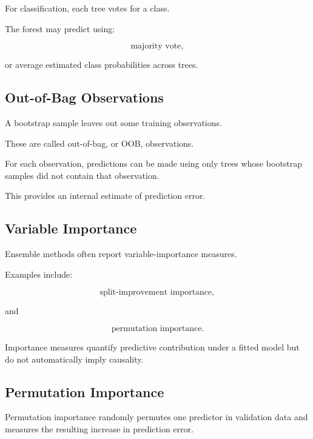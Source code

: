 For classification, each tree votes for a class.

The forest may predict using:

\[
\boxed{
\text{majority vote},
}
\]

or average estimated class probabilities across trees.

\subsection{Out-of-Bag Observations}
\label{subsec:out-of-bag}

A bootstrap sample leaves out some training observations.

These are called out-of-bag, or OOB, observations.

For each observation, predictions can be made using only trees whose
bootstrap samples did not contain that observation.

This provides an internal estimate of prediction error.

\subsection{Variable Importance}
\label{subsec:variable-importance}

Ensemble methods often report variable-importance measures.

Examples include:

\[
\boxed{
\text{split-improvement importance},
}
\]

and

\[
\boxed{
\text{permutation importance}.
}
\]

Importance measures quantify predictive contribution under a fitted model
but do not automatically imply causality.

\subsection{Permutation Importance}
\label{subsec:permutation-importance}

Permutation importance randomly permutes one predictor in validation data
and measures the resulting increase in prediction error.

